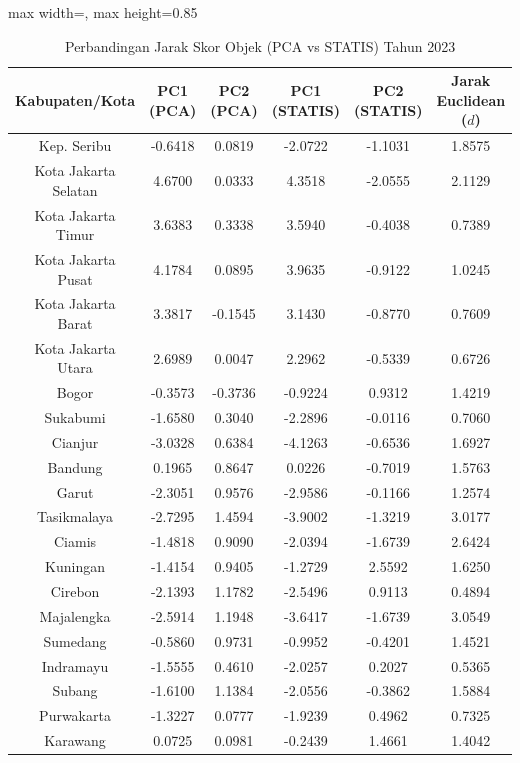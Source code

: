 \begin{table}[H]
\centering
\caption{Perbandingan Jarak Skor Objek (PCA vs STATIS) Tahun 2023} \label{tab:appjarak_skor_2023}
\begin{adjustbox}{max width=\textwidth, max height=0.85\textheight}
\begin{tabular}{|c|c|c|c|c|c|}
\hline
\textbf{Kabupaten/Kota} & \textbf{PC1 (PCA)} & \textbf{PC2 (PCA)} & \textbf{PC1 (STATIS)} & \textbf{PC2 (STATIS)} & \textbf{Jarak Euclidean ($d$)} \\
\hline
Kep. Seribu & -0.6418 & 0.0819 & -2.0722 & -1.1031 & 1.8575 \\
Kota Jakarta Selatan & 4.6700 & 0.0333 & 4.3518 & -2.0555 & 2.1129 \\
Kota Jakarta Timur & 3.6383 & 0.3338 & 3.5940 & -0.4038 & 0.7389 \\
Kota Jakarta Pusat & 4.1784 & 0.0895 & 3.9635 & -0.9122 & 1.0245 \\
Kota Jakarta Barat & 3.3817 & -0.1545 & 3.1430 & -0.8770 & 0.7609 \\
Kota Jakarta Utara & 2.6989 & 0.0047 & 2.2962 & -0.5339 & 0.6726 \\
Bogor & -0.3573 & -0.3736 & -0.9224 & 0.9312 & 1.4219 \\
Sukabumi & -1.6580 & 0.3040 & -2.2896 & -0.0116 & 0.7060 \\
Cianjur & -3.0328 & 0.6384 & -4.1263 & -0.6536 & 1.6927 \\
Bandung & 0.1965 & 0.8647 & 0.0226 & -0.7019 & 1.5763 \\
Garut & -2.3051 & 0.9576 & -2.9586 & -0.1166 & 1.2574 \\
Tasikmalaya & -2.7295 & 1.4594 & -3.9002 & -1.3219 & 3.0177 \\
Ciamis & -1.4818 & 0.9090 & -2.0394 & -1.6739 & 2.6424 \\
Kuningan & -1.4154 & 0.9405 & -1.2729 & 2.5592 & 1.6250 \\
Cirebon & -2.1393 & 1.1782 & -2.5496 & 0.9113 & 0.4894 \\
Majalengka & -2.5914 & 1.1948 & -3.6417 & -1.6739 & 3.0549 \\
Sumedang & -0.5860 & 0.9731 & -0.9952 & -0.4201 & 1.4521 \\
Indramayu & -1.5555 & 0.4610 & -2.0257 & 0.2027 & 0.5365 \\
Subang & -1.6100 & 1.1384 & -2.0556 & -0.3862 & 1.5884 \\
Purwakarta & -1.3227 & 0.0777 & -1.9239 & 0.4962 & 0.7325 \\
Karawang & 0.0725 & 0.0981 & -0.2439 & 1.4661 & 1.4042 \\

\end{tabular}
\end{adjustbox}
\end{table}
